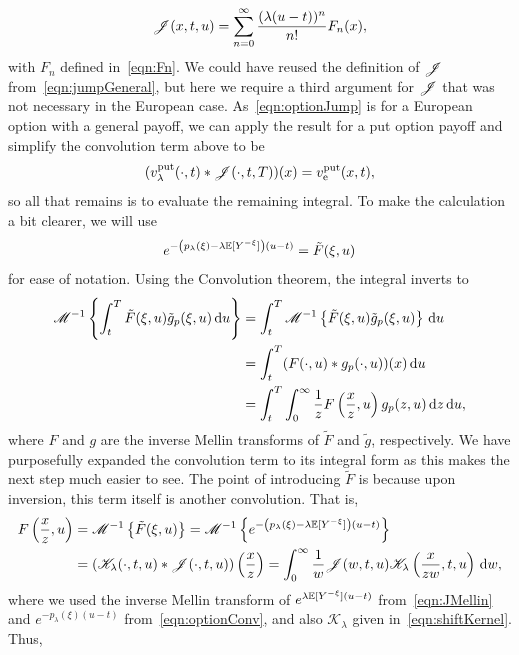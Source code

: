       \begin{equation}
      		\label{eqn:Jnew}
        \mathscr J(x,t,u) = \sum\limits_{n=0}^\infty \frac{(\lambda(u-t))^n}{n!}F_n(x),
      \end{equation}
    with $F_n$ defined in~\eqref{eqn:Fn}. We could have reused the definition of $\mathscr J$ from~\eqref{eqn:jumpGeneral}, but here we require a third argument for $\mathscr J$ that was not necessary in the European case.
    As~\eqref{eqn:optionJump} is for a European option with a general payoff, we can apply the result for a put option payoff and simplify the convolution term above to be
      $$
        (v_\lambda^{\text{put}}(\cdot,t) \ast \mathscr J(\cdot, t, T))(x) = v_{\text{e}}^{\text{put}}(x,t),
      $$
    so all that remains is to evaluate the remaining integral. To make the calculation a bit clearer, we will use
    	$$
    		e^{-\left(p_\lambda(\xi) -\lambda\mathbb E[Y^{-\xi}]\right)(u-t)} = \tilde{F}(\xi,u)
    	$$
    	for ease of notation. Using the Convolution theorem, the integral inverts to
      \begin{align*}
          \mathscr M^{-1}\left\{ \int_t^T \tilde{F}(\xi,u)\tilde{g}_p(\xi,u) \, \mathrm d u \right\} &=
          \int_t^T \mathscr M^{-1}\left\{\tilde{F}(\xi,u)\tilde{g}_p(\xi,u)\right\} \,\mathrm d u \\
          &= \int_t^T (F(\cdot,u)\ast g_p(\cdot,u))(x) \, \mathrm d u \\
          &= \int_t^T \int_0^\infty \frac{1}{z}F\left(\frac{x}{z},u\right)g_p(z,u) \, \mathrm d z \, \mathrm d u,
        \end{align*}
        where $F$ and $g$ are the inverse Mellin transforms of $\tilde F$ and $\tilde g$, respectively. We have purposefully expanded the convolution term to its integral form as this makes the next step much easier to see. The point of introducing $\tilde F$ is because upon inversion, this term itself is another convolution. That is,
        \begin{align*}
        	F\left(\frac{x}{z},u\right) &= \mathscr M^{-1}\left\{\tilde{F}(\xi,u)\right\} = \mathscr M^{-1}\left\{e^{-\left(p_\lambda(\xi) -\lambda\mathbb E[Y^{-\xi}]\right)(u-t)}\right\} \\
        	&= (\mathscr K_\lambda(\cdot,t,u)\ast \mathscr J(\cdot,t,u))\left(\frac{x}{z}\right) = \int_0^\infty \frac{1}{w}\mathscr J(w,t,u)\mathscr K_\lambda\left( \frac{x}{zw},t,u \right) \, \mathrm d w,
        \end{align*}
        where we used the inverse Mellin transform of $e^{\lambda\mathbb E[Y^{-\xi}](u-t)}$ from~\eqref{eqn:JMellin} and $e^{-p_\lambda(\xi)(u-t)}$ from~\eqref{eqn:optionConv}, and also $\mathscr{K}_\lambda$ given in~\eqref{eqn:shiftKernel}. Thus,
